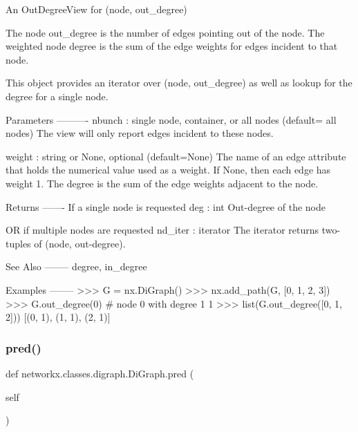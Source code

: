 \begin{DoxyVerb}An OutDegreeView for (node, out_degree)

The node out_degree is the number of edges pointing out of the node.
The weighted node degree is the sum of the edge weights for
edges incident to that node.

This object provides an iterator over (node, out_degree) as well as
lookup for the degree for a single node.

Parameters
----------
nbunch : single node, container, or all nodes (default= all nodes)
    The view will only report edges incident to these nodes.

weight : string or None, optional (default=None)
   The name of an edge attribute that holds the numerical value used
   as a weight.  If None, then each edge has weight 1.
   The degree is the sum of the edge weights adjacent to the node.

Returns
-------
If a single node is requested
deg : int
    Out-degree of the node

OR if multiple nodes are requested
nd_iter : iterator
    The iterator returns two-tuples of (node, out-degree).

See Also
--------
degree, in_degree

Examples
--------
>>> G = nx.DiGraph()
>>> nx.add_path(G, [0, 1, 2, 3])
>>> G.out_degree(0)  # node 0 with degree 1
1
>>> list(G.out_degree([0, 1, 2]))
[(0, 1), (1, 1), (2, 1)]\end{DoxyVerb}
 \mbox{\label{classnetworkx_1_1classes_1_1digraph_1_1DiGraph_ab3c66a8f8cdedf35802d8b6bc0dd6ba6}} 
\subsubsection{\texorpdfstring{pred()}{pred()}}
{\footnotesize\ttfamily def networkx.\+classes.\+digraph.\+Di\+Graph.\+pred (\begin{DoxyParamCaption}\item[{}]{self }\end{DoxyParamCaption})}

